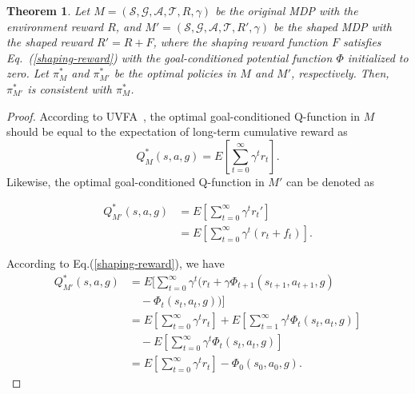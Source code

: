 \documentclass[journal]{IEEEtran}
\newtheorem{theorem}{Theorem}
\begin{document}
\appendix[\textcolor{black}{Proof of the Optimal Policy Invariance of MFRS}]
\begin{theorem}
    Let $M = (\mathcal{S},\mathcal{G},\mathcal{A},\mathcal{T},R,\gamma)$ be the original MDP with the environment reward $R$, and $M' = (\mathcal{S},\mathcal{G},\mathcal{A},\mathcal{T},R',\gamma)$ be the shaped MDP with the shaped reward $R'=R+F$, where the shaping reward function $F$ satisfies Eq.~(\ref{shaping-reward}) with the goal-conditioned potential function $\Phi$ initialized to zero. 
    Let $\pi_{M}^{*}$ and $\pi_{M'}^{*}$ be the optimal policies in $M$ and $M'$, respectively.
    Then, $\pi_{M'}^{*}$ is consistent with $\pi_{M}^{*}$.
\end{theorem}
\begin{proof}
According to UVFA~\citep{schaul2015universal}, the optimal goal-conditioned Q-function in $M$ should be equal to the expectation of long-term cumulative reward as
\begin{equation}
    Q^{*}_{M}(s,a,g) = E\left[\sum_{t=0}^{\infty} \gamma^{t}r_{t}\right].
\end{equation}
Likewise, the optimal goal-conditioned Q-function in $M'$ can be denoted as

\begin{align}
    Q^{*}_{M'}(s,a,g) &= E\left[\sum_{t=0}^{\infty} \gamma^{t}r_{t}'\right] \nonumber\\
    &= E\left[\sum_{t=0}^{\infty} \gamma^{t}(r_{t} + f_{t})\right].
\end{align}

According to Eq.(\ref{shaping-reward}), we have
\begin{align}
     Q^{*}_{M'}(s,a,g) &= E\Bigg[\sum_{t=0}^{\infty} \gamma^{t}(r_{t}+\gamma \Phi_{t+1}(s_{t+1},a_{t+1},g) \nonumber\\
     &\quad - \Phi_{t}(s_t,a_t,g))\Bigg] \nonumber\\
     &= E\left[ \sum_{t=0}^\infty \gamma^{t}r_{t}\right] + 
     E\left[ \sum_{t=1}^\infty \gamma^{t}\Phi_{t}(s_t,a_t,g)\right] \nonumber\\ 
     &\quad - E\left[ \sum_{t=0}^\infty \gamma^{t}\Phi_t(s_t,a_t,g)\right] \nonumber\\
     &= E\left[\sum_{t=0}^\infty \gamma^{t}r_{t}\right] - \Phi_0(s_0,a_0,g).
\end{align}


\end{proof}
\end{document}
